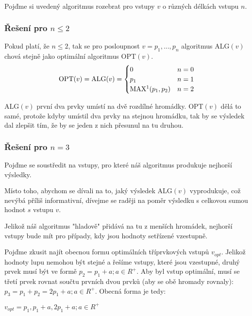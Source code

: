 \documentclass[a4paper, 12pt]{article}
\begin{document}
  Pojďme si uvedený algoritmus rozebrat pro vstupy $v$ o různých délkách vstupu $n$.

  \subsubsection{Řešení pro $n \le 2$}
  Pokud platí, že $n \le 2$, tak se pro posloupnost $v=p_1,...,p_n$ algoritmus ALG$(v)$ chová stejně jako optimální algoritmus OPT$(v)$.
  \newpage
  \begin{equation*}
      \text{OPT}(v)=\text{ALG}(v)= \begin{cases}
        0 & n=0
        \\
        p_1 & n=1
        \\
        \text{MAX\footnotemark}(p_1, p_2) & n=2
      \end{cases}
  \end{equation*}

  ALG$(v)$ první dva prvky umístí na dvě rozdílné hromádky. OPT$(v)$ dělá to samé, protože kdyby umístil dva prvky na stejnou hromádku, tak by se výsledek dal zlepšit tím, že by se jeden z nich přesunul na tu druhou.

  \subsubsection{Řešení pro $n=3$}
  Pojďme se soustředit na vstupy, pro které náš algoritmus produkuje nejhorší výsledky.

  Místo toho, abychom se dívali na to, jaký výsledek ALG$(v)$ vyprodukuje, což nevýbá příliš informativní, dívejme se raději na poměr výsledku s celkovou sumou hodnot $s$ vstupu $v$.

  Jelikož náš algoritmus "hladově" přidává na tu z menších hromádek, nejhorší vstupy bude mít pro případy, kdy jsou hodnoty setřízené vzestupně.

  Pojďme zkusit najít obecnou formu optimálních tříprvkových vstupů $v_{opt}$. Jelikož hodnoty lupu nemohou být stejné a řešíme vstupy, které jsou vzestupné, druhý prvek musí být ve formě $p_2=p_1+a; a \in R^+$. Aby byl vstup optimální, musí se třetí prvek rovnat součtu prvních dvou prvků (aby se obě hromady rovnaly): $p_3=p_1+p_2=2p_1+a; a \in R^+$. Obecná forma je tedy:
  \begin{center}
    $v_{opt}=p_1, p_1+a, 2p_1 + a; a \in R^+$
  \end{center}
\end{document}

